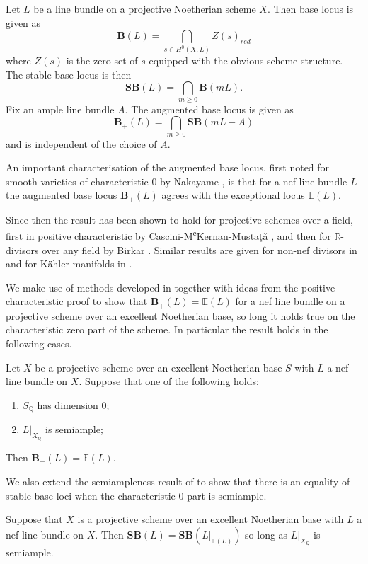 \documentclass[a4paper,12pt]{book}
\newcommand{\SB}{\mathbf{SB}}
\newcommand{\BB}{\mathbf{B}}
\newcommand{\BS}{\mathbf{B}_{+}}
\begin{document}
	\begin{definition}
		Let $L$ be a line bundle on a projective Noetherian scheme $X$. Then base locus is given as 
		$$\BB(L)= \bigcap_{s \in H^{0}(X,L)} Z(s)_{red}$$
		where $Z(s)$ is the zero set of $s$ equipped with the obvious scheme structure. The stable base locus is then
		$$\SB(L)=\bigcap_{m \geq 0}\BB(mL).$$
		Fix an ample line bundle $A$. The augmented base locus is given as 
		$$\BS(L)=\bigcap_{m \geq 0}\SB(mL-A)$$
		and is independent of the choice of $A$.
		
	\end{definition} 
	
	An important characterisation of the augmented base locus, first noted for smooth varieties of characteristic $0$ by Nakayame \cite{nakamaye2000stable}, is that for a nef line bundle $L$ the augmented base locus $\BS(L)$ agrees with the exceptional locus $\mathbb{E}(L)$. 
	
	Since then the result has been shown to hold for projective schemes over a field, first in positive characteristic by Cascini-M\textsuperscript{c}Kernan-Musta\c{t}\v{a} \cite{cascini2014augmented}, and then for $\mathbb{R}$-divisors over any field by Birkar \cite{birkar2017augmented}. Similar results are given for non-nef divisors in \cite{ein2009restricted} and for K\"{a}hler manifolds in \cite{collins2015kahler}.
	
	We make use of methods developed in \cite{witaszek2020keels} together with ideas from the positive characteristic proof to show that $\BS(L)=\mathbb{E}(L)$ for a nef line bundle on a projective scheme over an excellent Noetherian base, so long it holds true on the characteristic zero part of the scheme. In particular the result holds in the following cases.
	
	\begin{theorem}
		Let $X$ be a projective scheme over an excellent Noetherian base $S$ with $L$ a nef line bundle on $X$. 
		Suppose that one of the following holds:
		\begin{enumerate}
			\item $S_{\mathbb{Q}}$ has dimension $0$;
			\item $L|_{X_{\mathbb{Q}}}$ is semiample;
		\end{enumerate}
		Then $\BS(L)=\mathbb{E}(L)$.
	\end{theorem}
	
	We also extend the semiampleness result of \cite{witaszek2020keels} to show that there is an equality of stable base loci when the characteristic $0$ part is semiample.
	
	\begin{theorem}
		Suppose that $X$ is a projective scheme over an excellent Noetherian base with $L$ a nef line bundle on $X$. Then $\SB(L)=\SB(L|_{\mathbb{E}(L)})$ so long as $L|_{X_{\mathbb{Q}}}$ is semiample.
	\end{theorem} 
	 
	
	
	
		
	
	
	
	
	

	
	
\end{document}
